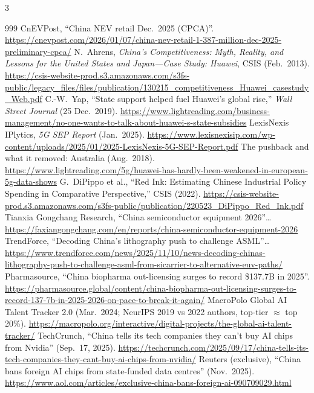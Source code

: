 \begin{multicols}{3}
\begin{thebibliography}{999}
 CnEVPost, ``China NEV retail Dec.\ 2025 (CPCA)''. \url{https://cnevpost.com/2026/01/07/china-nev-retail-1-387-million-dec-2025-preliminary-cpca/}
 N.~Ahrens, \emph{China's Competitiveness: Myth, Reality, and Lessons for the United States and Japan---Case Study: Huawei}, CSIS (Feb.\ 2013). \url{https://csis-website-prod.s3.amazonaws.com/s3fs-public/legacy_files/files/publication/130215_competitiveness_Huawei_casestudy_Web.pdf}
 C.-W.~Yap, ``State support helped fuel Huawei's global rise,'' \emph{Wall Street Journal} (25 Dec.\ 2019). \url{https://www.lightreading.com/business-management/no-one-wants-to-talk-about-huawei-s-state-subsidies}
 LexisNexis IPlytics, \emph{5G SEP Report} (Jan.\ 2025). \url{https://www.lexisnexisip.com/wp-content/uploads/2025/01/2025-LexisNexis-5G-SEP-Report.pdf}
 The pushback and what it removed: Australia (Aug.\ 2018). \url{https://www.lightreading.com/5g/huawei-has-hardly-been-weakened-in-european-5g-data-shows}
 G.~DiPippo et al., ``Red Ink: Estimating Chinese Industrial Policy Spending in Comparative Perspective,'' CSIS (2022). \url{https://csis-website-prod.s3.amazonaws.com/s3fs-public/publication/220523_DiPippo_Red_Ink.pdf}
 Tianxia Gongchang Research, ``China semiconductor equipment 2026''… \url{https://faxiangongchang.com/en/reports/china-semiconductor-equipment-2026}
 TrendForce, ``Decoding China's lithography push to challenge ASML''… \url{https://www.trendforce.com/news/2025/11/10/news-decoding-chinas-lithography-push-to-challenge-asml-from-sicarrier-to-alternative-euv-paths/}
 Pharmasource, ``China biopharma out-licensing surges to record \$137.7B in 2025''. \url{https://pharmasource.global/content/china-biopharma-out-licensing-surges-to-record-137-7b-in-2025-2026-on-pace-to-break-it-again/}
 MacroPolo Global AI Talent Tracker 2.0 (Mar.\ 2024; NeurIPS 2019 vs 2022 authors, top-tier $\approx$ top 20\%). \url{https://macropolo.org/interactive/digital-projects/the-global-ai-talent-tracker/}
 TechCrunch, ``China tells its tech companies they can't buy AI chips from Nvidia'' (Sep.\ 17, 2025). \url{https://techcrunch.com/2025/09/17/china-tells-its-tech-companies-they-cant-buy-ai-chips-from-nvidia/}
 Reuters (exclusive), ``China bans foreign AI chips from state-funded data centres'' (Nov.\ 2025). \url{https://www.aol.com/articles/exclusive-china-bans-foreign-ai-090709029.html}

\end{thebibliography}
\end{multicols}
